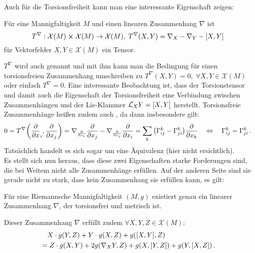 Auch für die Torsionsfreiheit kann man eine interessante Eigenschaft zeigen:
\begin{lemma}[Torsionstensor]
Für eine Mannigfaltigkeit $M$ und einen linearen Zusammenhang $\nabla$ ist
\begin{equation}
T^\nabla: \mathcal{X}(M) \cross \mathcal{X}(M) \rightarrow \mathcal{X}(M), \; T^\nabla(X, Y) = \nabla_X - \nabla_Y - \qty[X, Y]
\end{equation}
für Vektorfelder $X, Y \in \mathcal{X}(M)$ ein Tensor.
\end{lemma}
$T^\nabla$ wird auch  genannt und mit ihm kann man die Bedingung für einen torsionsfreien Zusammenhang umschreiben zu $T^\nabla(X, Y) = 0, \; \forall X, Y \in \mathcal{X}(M)$ oder einfach $T^\nabla = 0$. Eine interessante Beobachtung ist, dass der Torsionstensor und damit auch die Eigenschaft der Torsionsfreiheit eine Verbindung zwischen Zusammenhängen und der Lie-Klammer $\mathcal{L}_X Y = \qty[X, Y]$ herstellt. Torsionsfreie Zusammenhänge heißen zudem auch , da dann insbesondere gilt:
\begin{equation}
0 = T^\nabla\qty(\pdv{x}_i, \pdv{x_j}) = \nabla_{\pdv{x_i}} \pdv{x_j} - \nabla_{\pdv{x_j}} \pdv{x_i} = \sum_k \qty(\Gamma_{ij}^k - \Gamma_{ji}^k) \pdv{x_k} \quad \Leftrightarrow \quad \Gamma_{ij}^k = \Gamma_{ji}^k \, .
\end{equation}
Tatsächlich handelt es sich sogar um eine Äquivalenz (hier nicht ersichtlich).\\


Es stellt sich nun heraus, dass diese zwei Eigenschaften starke Forderungen sind, die bei Weitem nicht alle Zusammenhänge erfüllen. Auf der anderen Seite sind sie gerade nicht zu stark, dass kein Zusammenhang sie erfüllen kann, es gilt:
\begin{satz}
Für eine Riemannsche Mannigfaltigkeit $(M, g)$ existiert genau ein linearer Zusammenhang $\nabla$, der torsionsfrei und metrisch ist.

Dieser Zusammenhang $\nabla$ erfüllt zudem $\forall X, Y, Z \in \mathcal{X}(M)$:
\begin{equation}\label{eq:koszul}
\begin{split}
& \quad X \cdot g(Y, Z) + Y \cdot g(X, Z) + g\qty([X, Y], Z) 
\\
&= Z \cdot g(X, Y) + 2 g\qty(\nabla_X Y, Z) + g\qty(X, [Y, Z]) + g\qty(Y, [X, Z]) \, .
\end{split}
\end{equation}
\end{satz}

